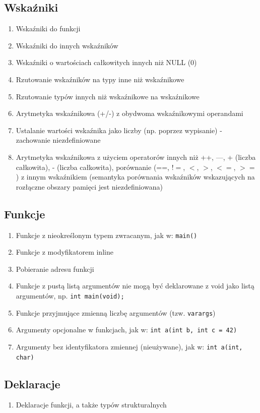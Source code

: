 \documentclass[a4paper,twoside,openright,11pt]{report}
\begin{document}
  \subsection {Wskaźniki}
    \begin{enumerate}
      \item Wskaźniki do funkcji
      \item Wskaźniki do innych wskaźników
      \item Wskaźniki o wartościach całkowitych innych niż NULL (0)
      \item Rzutowanie wskaźników na typy inne niż wskaźnikowe
      \item Rzutowanie typów innych niż wskaźnikowe na wskaźnikowe
      \item Arytmetyka wskaźnikowa (+/-) z obydwoma wskaźnikowymi operandami
      \item Ustalanie wartości wskaźnika jako liczby (np. poprzez wypisanie) - zachowanie niezdefiniowane
      \item Arytmetyka wskaźnikowa z użyciem operatorów innych niż ++, —, + (liczba całkowita), - (liczba całkowita), porównanie (==, !$=$, $<$, $>$, $<=$, $>=$) z innym wskaźnikiem (semantyka porównania wskaźników wskazujących na rozłączne obszary pamięci jest niezdefiniowana)
    \end{enumerate}
  \subsection {Funkcje}
    \begin{enumerate}
      \item Funkcje z nieokreślonym typem zwracanym, jak w: \texttt{main()} { }
      \item Funkcje z modyfikatorem inline
      \item Pobieranie adresu funkcji
      \item Funkcje z pustą listą argumentów nie mogą być deklarowane z void jako listą argumentów, np. \texttt{int main(void);}
      \item Funkcje przyjmujące zmienną liczbę argumentów (tzw. \texttt{varargs})
      \item Argumenty opcjonalne w funkcjach, jak w: \texttt{int a(int b, int c = 42)} { }
      \item Argumenty bez identyfikatora zmiennej (nieużywane), jak w: \texttt{int a(int, char)} { }
    \end{enumerate}
  \subsection {Deklaracje}
    \begin{enumerate}
      \item Deklaracje funkcji, a także typów strukturalnych 
    \end{enumerate}
\end{document}
